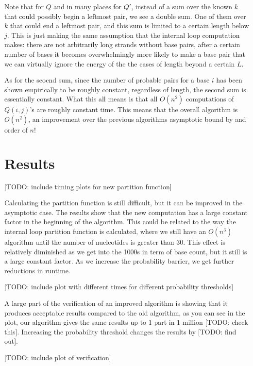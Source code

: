 Note that for $Q$ and in many places for $Q'$, instead of a sum over
the known $k$ that could possibly begin a leftmost pair, we see a
double sum. One of them over $k$ that could end a leftmost pair, and
this sum is limited to a certain length below $j$. This is just making
the same assumption that the internal loop computation makes: there
are not arbitrarily long strands without base pairs, after a certain
number of bases it becomes overwhelmingly more likely to make a base
pair that we can virtually ignore the energy of the the cases of
length beyond a certain $L$.

As for the seocnd sum, since the number of probable pairs for a base
$i$ has been shown empirically to be roughly constant, regardless of
length, the second sum is essentially constant. What this all means is
that all $O(n^2)$ computations of $Q(i,j)$'s are roughly constant
time. This means that the overall algorithm is $O(n^2)$, an
improvement over the previous algorithms asymptotic bound by and order
of $n$!



\section{Results}

[TODO: include timing plots for new partition function]

Calculating the partition function is still difficult, but it can be
improved in the asymptotic case. The results show that the new
computation has a large constant factor in the beginning of the
algorithm. This could be related to the way the internal loop
partition function is calculated, where we still have an $O(n^3)$
algorithm until the number of nucleotides is greater than 30. This
effect is relatively diminished as we get into the 1000s in term of
base count, but it still is a large constant factor. As we increase
the probability barrier, we get further reductions in runtime.

[TODO: include plot with different times for different probability
thresholds]

A large part of the verification of an improved algorithm is showing
that it produces acceptable results compared to the old algorithm, as
you can see in the plot, our algorithm gives the same results up to 1
part in 1 million [TODO: check this]. Increasing the probability
threshold changes the results by [TODO: find out].

[TODO: include plot of verification]

